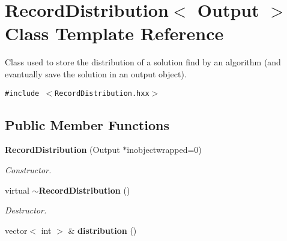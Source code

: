 \section{Record\-Distribution$<$ Output $>$ Class Template Reference}
\label{class_record_distribution}
Class used to store the distribution of a solution find by an algorithm (and evantually save the solution in an output object).  


{\tt \#include $<$Record\-Distribution.hxx$>$}

\subsection*{Public Member Functions}
\begin{CompactItemize}
\item 
{\bf Record\-Distribution} (Output $\ast$inobjectwrapped=0)\label{class_record_distribution_3a21d8d0c0f191202986d518ed1fcf49}

\begin{CompactList}\small\item\em Constructor. \item\end{CompactList}\item 
virtual {\bf $\sim$Record\-Distribution} ()\label{class_record_distribution_5b8461d785ece13a14f24163b086b340}

\begin{CompactList}\small\item\em Destructor. \item\end{CompactList}\item 
vector$<$ int $>$ \& {\bf distribution} ()\label{class_record_distribution_d116898ebb6a753623e55f89063aaf53}


\end{CompactItemize}
